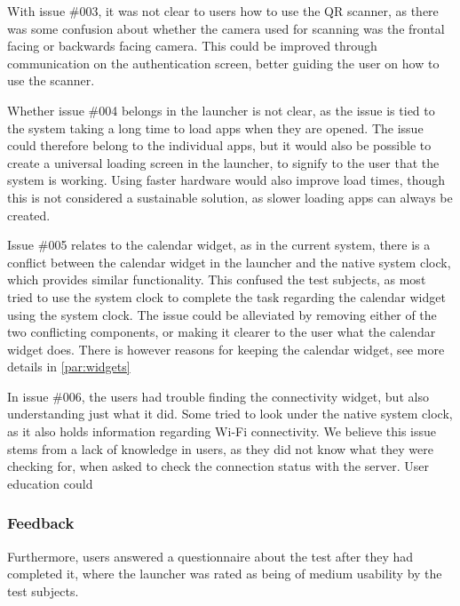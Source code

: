 With issue \#{}003, it was not clear to users how to use the QR scanner, as there was some confusion about whether the camera used for scanning was the frontal facing or backwards facing camera. 
This could be improved through communication on the authentication screen, better guiding the user on how to use the scanner. \newline

Whether issue \#{}004 belongs in the launcher is not clear, as the issue is tied to the system taking a long time to load apps when they are opened. 
The issue could therefore belong to the individual apps, but it would also be possible to create a universal loading screen in the launcher, to signify to the user that the system is working. 
Using faster hardware would also improve load times, though this is not considered a sustainable solution, as slower loading apps can always be created. \newline

Issue \#{}005 relates to the calendar widget, as in the current system, there is a conflict between the calendar widget in the \giraf[] launcher and the native system clock, which provides similar functionality. 
This confused the test subjects, as most tried to use the system clock to complete the task regarding the calendar widget using the system clock. 
The issue could be alleviated by removing either of the two conflicting components, or making it clearer to the user what the calendar widget does. 
There is however reasons for keeping the calendar widget, see more details in \autoref{par:widgets} \newline

In issue \#{}006, the users had trouble finding the connectivity widget, but also understanding just what it did. 
Some tried to look under the native system clock, as it also holds information regarding Wi-Fi connectivity. 
We believe this issue stems from a lack of knowledge in users, as they did not know what they were checking for, when asked to check the connection status with the server. 
User education could 

\subsubsection{Feedback}
Furthermore, users answered a questionnaire about the test after they had completed it, where the launcher was rated as being of medium usability by the test subjects. 